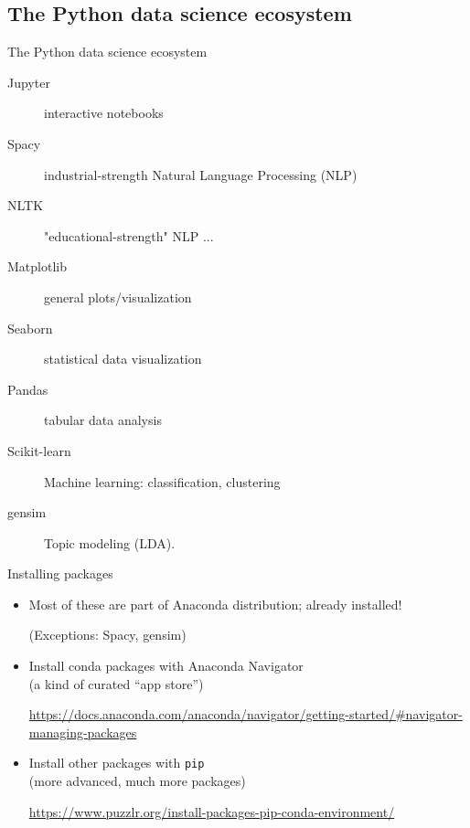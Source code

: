 \documentclass[aspectratio=169,usenames,dvipsnames]{beamer}
\begin{document}
\subsection{The Python data science ecosystem}
\begin{frame}[fragile]{The Python data science ecosystem}
    \begin{description}
        \item[Jupyter] interactive notebooks
        \item[Spacy] industrial-strength Natural Language Processing (NLP)
        \item[NLTK] "educational-strength" NLP ...
        \item[Matplotlib] general plots/visualization
        \item[Seaborn] statistical data visualization
        \item[Pandas] tabular data analysis
        \item[Scikit-learn] Machine learning: classification, clustering
        \item[gensim] Topic modeling (LDA).
    \end{description}
\end{frame}

\begin{frame}{Installing packages}
    \begin{itemize}
        \item Most of these are part of Anaconda distribution; already installed!

			(Exceptions: Spacy, gensim)
        \item Install conda packages with Anaconda Navigator \\
			(a kind of curated ``app store'')

            \url{https://docs.anaconda.com/anaconda/navigator/getting-started/\#navigator-managing-packages}

        \item Install other packages with \texttt{pip} \\
			(more advanced, much more packages)

            \url{https://www.puzzlr.org/install-packages-pip-conda-environment/}
    \end{itemize}
\end{frame}
\end{document}
